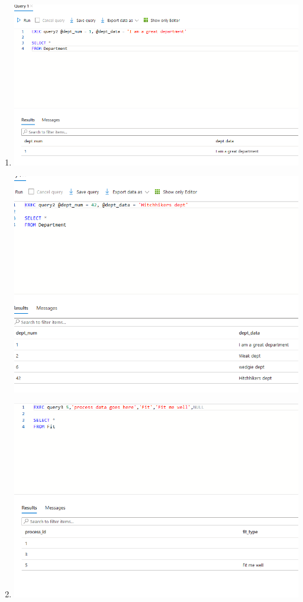 \documentclass[11pt]{article}
\begin{document}
\begin{enumerate}
\item
\includegraphics[width = \textwidth]{insertDept1.png}

\includegraphics[width = \textwidth]{insertDept2.png}

\item
\includegraphics[width = \textwidth]{insertProcess1.png}


\end{enumerate}
\end{document}
